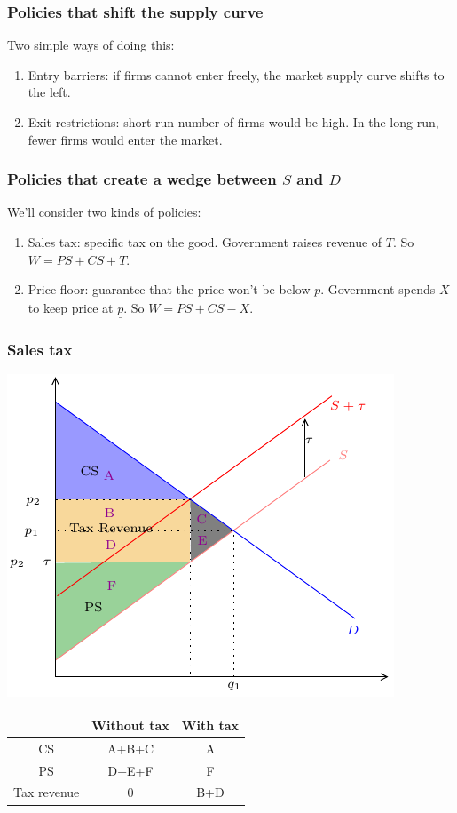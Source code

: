 \documentclass[xcolor=pdftex,dvipsnames]{beamer}
\begin{document}
\begin{frame}
\frametitle{Policies that shift the supply curve}
Two simple ways of doing this:
\begin{enumerate}
[<+->]
\item Entry barriers: if firms cannot enter freely, the market supply
  curve shifts to the left.
\item Exit restrictions: short-run number of firms would be high. In
  the long run, fewer firms would enter the market.

\end{enumerate}
\end{frame}



\begin{frame}
\frametitle{Policies that create a wedge between $S$ and $D$}
We'll consider two kinds of policies:
\begin{enumerate}[<+->]
\item Sales tax: specific tax on the good. Government raises revenue
  of $T$. So $W=PS+CS+T$.
\item Price floor: guarantee that the price won't be below $\underline
  p$. Government spends $X$ to keep price at $\underline p$. So $W=PS+CS-X$.
\end{enumerate}
\bigskip
\end{frame}



\begin{frame}
\frametitle{Sales tax}
\begin{center}
\includegraphics{pics/EffectOfSalesTax}

\begin{tabular}{|c|c|c|}\hline &Without tax & With tax\\
\hline CS & A+B+C & A\\
\hline PS & D+E+F & F\\
\hline Tax revenue & 0 & B+D
\\
\hline
\end{tabular}
\end{center}
\end{frame}
\end{document}
